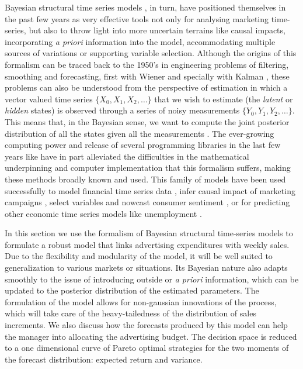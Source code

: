 Bayesian structural time series models \cite{scott2014predicting}, in turn, have positioned themselves in the past few years as very effective tools  not only for analysing marketing time-series, but also to throw light into more uncertain terrains like  causal impacts, incorporating \emph{a priori} information into the model, accommodating multiple sources of variations or supporting variable selection. Although the origins of this formalism can be traced back to the 1950's in engineering problems of filtering, smoothing and forecasting, first with Wiener \cite{wiener1949extrapolation} and specially with Kalman \cite{kalman1960new}, these problems can also be understood from the perspective of estimation in which a vector valued time series $\{ X_0, X_1, X_2, \ldots\}$ that we wish to estimate (the \emph{latent} or \emph{hidden} states) is observed through a series of noisy measurements $\{ Y_0, Y_1, Y_2, \ldots\}$. This  means that, in the Bayesian sense, we want to compute the joint posterior distribution of all the states given all the measurements \cite{sarkka2013bayesian}. The ever-growing computing power and release of several programming libraries  in the last few years like \cite{petris2010r, scott2016bsts} have in part alleviated the difficulties in the mathematical underpinning and computer implementation  that this formalism suffers, making these methods broadly known and used. This family of models have been used successfully to model financial time series data \cite{doi:10.1002/asmb.428}, infer causal impact of marketing campaigns \cite{brodersen2015inferring}, select variables and nowcast consumer sentiment  \cite{scott2015bayesian}, or for predicting other economic time series models like unemployment \cite{scott2014predicting}.

In this section we use the formalism of Bayesian structural time-series models to formulate a robust model that links advertising expenditures with weekly sales. Due to the flexibility and modularity of the model, it will be well suited to generalization to various markets or situations. Its Bayesian nature also adapts smoothly to the issue of introducing outside or \emph{a priori} information, which can be updated to the posterior distribution of the estimated parameters. The formulation of the model allows for non-gaussian innovations of the process, which will take care of the heavy-tailedness of the distribution of sales increments. We also discuss how the forecasts produced by this model can help the manager into allocating the advertising budget. The decision space is reduced to a one dimensional curve of Pareto optimal strategies for the two moments of the forecast distribution: expected return and variance.

